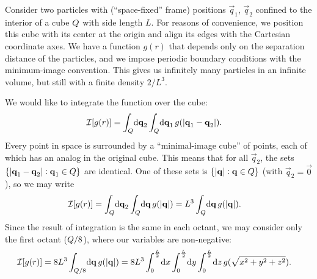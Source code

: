 Consider two particles with (``space-fixed'' frame) positions $\vec{q}_1$, $\vec{q}_2$ confined to the interior of a cube $Q$ with side length $L$.
For reasons of convenience, we position this cube with its center at the origin and align its edges with the Cartesian coordinate axes.
We have a function $g(r)$ that depends only on the separation distance of the particles, and we impose periodic boundary conditions with the minimum-image convention.
This gives us infinitely many particles in an infinite volume, but still with a finite density $2/L^3$.

We would like to integrate the function over the cube:
\begin{align}
	\mathcal{I}[g(r)]
	&= \int_\cube\! \dif \vec{q}_2 \int_\cube\! \dif \vec{q}_1 \, g(\abs[0]{\vec{q}_1 - \vec{q}_2}).
\end{align}
Every point in space is surrounded by a ``minimal-image cube'' of points, each of which has an analog in the original cube.
This means that for all $\vec{q}_2$, the sets $\{ \abs[0]{\bm{\mathbf{q}}_1 - \bm{\mathbf{q}}_2} : \bm{\mathbf{q}}_1 \in Q \}$ are identical.
One of these sets is $\{ \abs[0]{\bm{\mathbf{q}}} : \bm{\mathbf{q}} \in Q \}$ (with $\vec{q}_2 = \vec{0}$), so we may write
\begin{align}
	\mathcal{I}[g(r)]
	&= \int_\cube\! \dif \vec{q}_2 \int_\cube\! \dif \vec{q} \, g(\abs[0]{\vec{q}})
	= L^3 \int_\cube\! \dif \vec{q} \, g(\abs[0]{\vec{q}}).
		\label{eq:periodic-box-minimal-image}
\end{align}
Since the result of integration is the same in each octant, we may consider only the first octant ($Q/8$), where our variables are non-negative:
\begin{align*}
	\mathcal{I}[g(r)]
	&= 8 L^3 \int_{\cube/8}\! \dif \vec{q} \, g(\abs[0]{\vec{q}})
	= 8 L^3 \int_0^{\frac{L}{2}}\! \dif x \int_0^{\frac{L}{2}}\! \dif y \int_0^{\frac{L}{2}}\! \dif z \, g(\sqrt{x^2 + y^2 + z^2}).
\end{align*}

